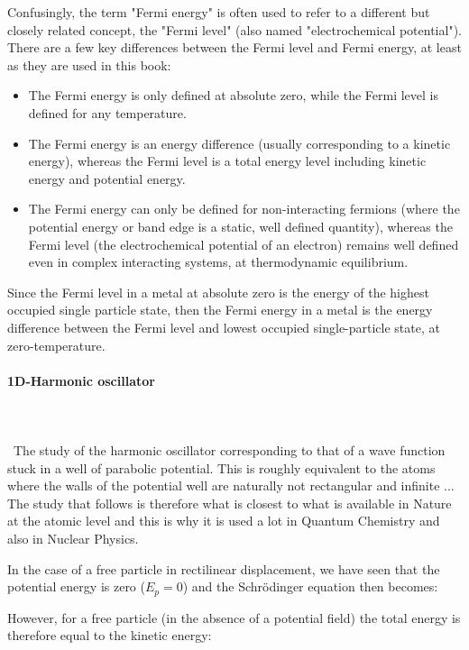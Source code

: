 	
	Confusingly, the term "Fermi energy" is often used to refer to a different but closely related concept, the "Fermi level" (also named "electrochemical potential"). There are a few key differences between the Fermi level and Fermi energy, at least as they are used in this book:
	\begin{itemize}
		\item The Fermi energy is only defined at absolute zero, while the Fermi level is defined for any temperature.

		\item The Fermi energy is an energy difference (usually corresponding to a kinetic energy), whereas the Fermi level is a total energy level including kinetic energy and potential energy.

		\item The Fermi energy can only be defined for non-interacting fermions (where the potential energy or band edge is a static, well defined quantity), whereas the Fermi level (the electrochemical potential of an electron) remains well defined even in complex interacting systems, at thermodynamic equilibrium.
	\end{itemize}
	Since the Fermi level in a metal at absolute zero is the energy of the highest occupied single particle state, then the Fermi energy in a metal is the energy difference between the Fermi level and lowest occupied single-particle state, at zero-temperature.
	
	
	\paragraph{1D-Harmonic oscillator}\mbox{}\\\\\
	The study of the harmonic oscillator corresponding to that of a wave function stuck in a well of parabolic potential. This is roughly equivalent to the atoms where the walls of the potential well are naturally not rectangular and infinite ... The study that follows is therefore what is closest to what is available in Nature at the atomic level and this is why it is used a lot in Quantum Chemistry and also in Nuclear Physics.

	In the case of a free particle in rectilinear displacement, we have seen that the potential energy is zero ($E_p=0$) and the Schrödinger equation then becomes:
	
	However, for a free particle (in the absence of a potential field) the total energy is therefore equal to the kinetic energy:
	
